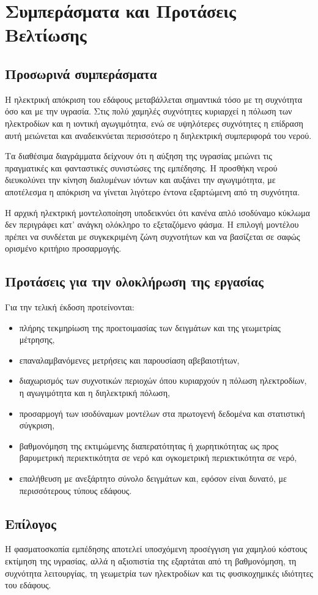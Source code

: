 \chapter{Συμπεράσματα και Προτάσεις Βελτίωσης}
\label{ch:conclusions}


\section{Προσωρινά συμπεράσματα}
Η ηλεκτρική απόκριση του εδάφους μεταβάλλεται σημαντικά τόσο με τη συχνότητα όσο και με την υγρασία. Στις πολύ χαμηλές συχνότητες κυριαρχεί η πόλωση των ηλεκτροδίων και η ιοντική αγωγιμότητα, ενώ σε υψηλότερες συχνότητες η επίδραση αυτή μειώνεται και αναδεικνύεται περισσότερο η διηλεκτρική συμπεριφορά του νερού.

Τα διαθέσιμα διαγράμματα δείχνουν ότι η αύξηση της υγρασίας μειώνει τις πραγματικές και φανταστικές συνιστώσες της εμπέδησης. Η προσθήκη νερού διευκολύνει την κίνηση διαλυμένων ιόντων και αυξάνει την αγωγιμότητα, με αποτέλεσμα η απόκριση να γίνεται λιγότερο έντονα εξαρτώμενη από τη συχνότητα.

Η αρχική ηλεκτρική μοντελοποίηση υποδεικνύει ότι κανένα απλό ισοδύναμο κύκλωμα δεν περιγράφει κατ' ανάγκη ολόκληρο το εξεταζόμενο φάσμα. Η επιλογή μοντέλου πρέπει να συνδέεται με συγκεκριμένη ζώνη συχνοτήτων και να βασίζεται σε σαφώς ορισμένο κριτήριο προσαρμογής.

\section{Προτάσεις για την ολοκλήρωση της εργασίας}
Για την τελική έκδοση προτείνονται:
\begin{itemize}
  \item πλήρης τεκμηρίωση της προετοιμασίας των δειγμάτων και της γεωμετρίας μέτρησης,
  \item επαναλαμβανόμενες μετρήσεις και παρουσίαση αβεβαιοτήτων,
  \item διαχωρισμός των συχνοτικών περιοχών όπου κυριαρχούν η πόλωση ηλεκτροδίων, η αγωγιμότητα και η διηλεκτρική πόλωση,
  \item προσαρμογή των ισοδύναμων μοντέλων στα πρωτογενή δεδομένα και στατιστική σύγκριση,
  \item βαθμονόμηση της εκτιμώμενης διαπερατότητας ή χωρητικότητας ως προς βαρυμετρική περιεκτικότητα σε νερό και ογκομετρική περιεκτικότητα σε νερό,
  \item επαλήθευση με ανεξάρτητο σύνολο δειγμάτων και, εφόσον είναι δυνατό, με περισσότερους τύπους εδάφους.
\end{itemize}

\section{Επίλογος}
Η φασματοσκοπία εμπέδησης αποτελεί υποσχόμενη προσέγγιση για χαμηλού κόστους εκτίμηση της υγρασίας, αλλά η αξιοπιστία της εξαρτάται από τη βαθμονόμηση, τη συχνότητα λειτουργίας, τη γεωμετρία των ηλεκτροδίων και τις φυσικοχημικές ιδιότητες του εδάφους.

